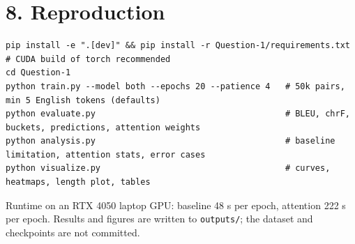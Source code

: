 \documentclass[10pt,a4paper]{article}
\begin{document}
\hypertarget{reproduction}{%
\section{8. Reproduction}\label{reproduction}}

\begin{verbatim}
pip install -e ".[dev]" && pip install -r Question-1/requirements.txt   # CUDA build of torch recommended
cd Question-1
python train.py --model both --epochs 20 --patience 4   # 50k pairs, min 5 English tokens (defaults)
python evaluate.py                                      # BLEU, chrF, buckets, predictions, attention weights
python analysis.py                                      # baseline limitation, attention stats, error cases
python visualize.py                                     # curves, heatmaps, length plot, tables
\end{verbatim}

Runtime on an RTX 4050 laptop GPU: baseline 48 s per epoch, attention 222 s per epoch. Results and figures are written to \texttt{outputs/}; the dataset and checkpoints are not committed.
\end{document}

